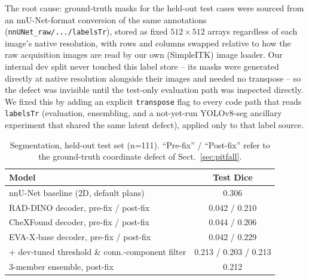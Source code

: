 \documentclass[runningheads]{llncs}
\begin{document}
The root cause: ground-truth masks for the held-out test cases were sourced
from an nnU-Net-format conversion of the same annotations
(\texttt{nnUNet\_raw/.../labelsTr}), stored as fixed $512\times512$ arrays
regardless of each image's native resolution, with rows and columns swapped
relative to how the raw acquisition images are read by our own (SimpleITK)
image loader. Our internal dev split never touched this label store --
its masks were generated directly at native resolution alongside their
images and needed no transpose -- so the defect was invisible until the
test-only evaluation path was inspected directly. We fixed this by adding an
explicit \texttt{transpose} flag to every code path that reads
\texttt{labelsTr} (evaluation, ensembling, and a not-yet-run YOLOv8-seg
ancillary experiment that shared the same latent defect), applied only to
that label source.

\begin{table}[t]
\centering
\caption{Segmentation, held-out test set (n=111). ``Pre-fix'' / ``Post-fix''
refer to the ground-truth coordinate defect of Sect.~\ref{sec:pitfall}.}
\label{tab:seg}
\begin{tabular}{lc}
\toprule
Model & Test Dice \\
\midrule
nnU-Net baseline (2D, default plans)          & 0.306 \\
RAD-DINO decoder, pre-fix / post-fix          & 0.042 / 0.210 \\
CheXFound decoder, pre-fix / post-fix         & 0.044 / 0.206 \\
EVA-X-base decoder, pre-fix / post-fix        & 0.042 / 0.229 \\
+ dev-tuned threshold \& conn.-component filter & 0.213 / 0.203 / 0.213 \\
3-member ensemble, post-fix                   & 0.212 \\
\bottomrule
\end{tabular}
\end{table}
\end{document}
